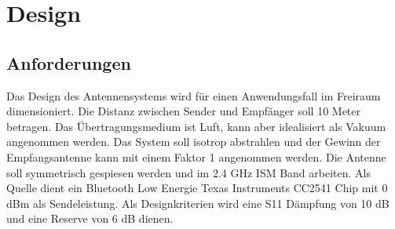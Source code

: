 \newpage
\section{Design}
\subsection{Anforderungen}
Das Design des Antennensystems wird für einen Anwendungsfall im Freiraum dimensioniert. Die Distanz zwischen Sender und Empfänger soll 10 Meter betragen. Das Übertragungsmedium ist Luft, kann aber idealisiert als Vakuum angenommen werden. Das System soll isotrop abstrahlen und der Gewinn der Empfangsantenne kann mit einem Faktor  1 angenommen werden. Die Antenne soll symmetrisch gespiesen werden und im 2.4 GHz ISM Band arbeiten. Als Quelle dient ein Bluetooth Low Energie Texas Instruments CC2541 Chip mit 0 dBm als Sendeleistung. Als Designkriterien wird eine S11 Dämpfung von 10 dB und eine Reserve von 6 dB dienen.




